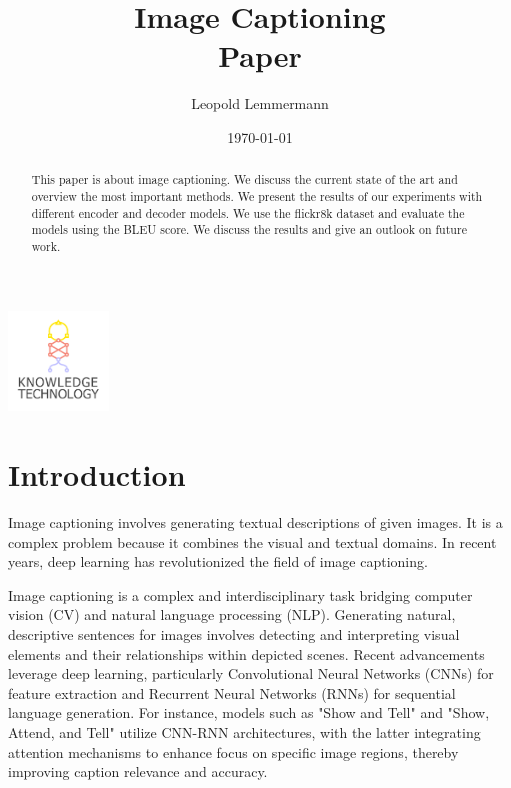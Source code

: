 \documentclass[12pt]{article}
\newcommand{\trauthor}{Leopold Lemmermann}
\newcommand{\trtype}{Paper}
\newcommand{\trtitle}{Image Captioning}
\newcommand{\trdate}{\today}
\theoremstyle{plain}
\theoremstyle{definition}
\theoremstyle{remark}
\begin{document}
\renewcommand{\headheight}{14.5pt}

\fancyhead{}
\fancyhead[CO]{\trtitle}



\title{\trtitle\\[0.2cm]{\normalsize\trtype}}
\author{\trauthor}
\date{\trdate}
\maketitle

\thispagestyle{empty}

\begin{center}
    \includegraphics[width=0.2\textwidth]{res/wtmicon.pdf}
\end{center}

\begin{abstract}
 This paper is about image captioning. We discuss the current state of the art and overview the most important methods. We present the results of our experiments with different encoder and decoder models. We use the flickr8k dataset and evaluate the models using the BLEU score. We discuss the results and give an outlook on future work.
\end{abstract}

\tableofcontents
\newpage
{}



\section{Introduction}
\label{sec:introduction}

Image captioning involves generating textual descriptions of given images. It is a complex problem because it combines the visual and textual domains. In recent years, deep learning has revolutionized the field of image captioning.

Image captioning is a complex and interdisciplinary task bridging computer vision (CV) and natural language processing (NLP). Generating natural, descriptive sentences for images involves detecting and interpreting visual elements and their relationships within depicted scenes. Recent advancements leverage deep learning, particularly Convolutional Neural Networks (CNNs) for feature extraction and Recurrent Neural Networks (RNNs) for sequential language generation. For instance, models such as "Show and Tell" \cite{Vinyals:2015} and "Show, Attend, and Tell" \cite{Xu} utilize CNN-RNN architectures, with the latter integrating attention mechanisms to enhance focus on specific image regions, thereby improving caption relevance and accuracy.
\end{document}
